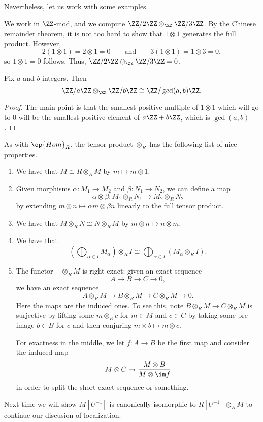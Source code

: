 Nevertheless, let us work with some examples.
\begin{example}
	We work in $\ZZ$-mod, and we compute $\ZZ/2\ZZ\otimes_\ZZ\ZZ/3\ZZ$. By the Chinese remainder theorem, it is not too hard to show that $1\otimes1$ generates the full product. However,
	\[2(1\otimes1)=2\otimes1=0\qquad\text{and}\qquad3(1\otimes1)=1\otimes3=0,\]
	so $1\otimes1=0$ follows. Thus, $\ZZ/2\ZZ\otimes_\ZZ\ZZ/3\ZZ=0$.
\end{example}
\begin{prop}
	Fix $a$ and $b$ integers. Then
	\[\ZZ/a\ZZ\otimes_\ZZ\ZZ/b\ZZ\cong\ZZ/\gcd(a,b)\ZZ.\]
\end{prop}
\begin{proof}
	The main point is that the smallest positive multiple of $1\otimes1$ which will go to $0$ will be the smallest positive element of $a\ZZ+b\ZZ$, which is $\gcd(a,b)$.
\end{proof}
As with $\op{Hom}_R$, the tensor product $\otimes_R$ has the following list of nice properties.
\begin{enumerate}
	\item We have that $M\cong R\otimes_RM$ by $m\mapsto m\otimes1$.
	\item Given morphisms $\alpha:M_1\to M_2$ and $\beta:N_1\to N_2$, we can define a map
	\[\alpha\otimes\beta:M_1\otimes_R N_1\to M_2\otimes_R N_2\]
	by extending $m\otimes n\mapsto\alpha m\otimes\beta n$ linearly to the full tensor product.
	\item We have that $M\otimes_R N\cong N\otimes_R M$ by $m\otimes n\mapsto n\otimes m$.
	\item We have that
	\[\left(\bigoplus_{\alpha\in I}M_\alpha\right)\otimes_RI\cong\bigoplus_{\alpha\in I}(M_\alpha\otimes_R I).\]
	\item The functor $-\otimes_RM$ is right-exact: given an exact sequence
	\[A\to B\to C\to 0,\]
	we have an exact sequence
	\[A\otimes_RM\to B\otimes_RM\to C\otimes_RM\to 0.\]
	Here the maps are the induced ones. To see this, note $B\otimes_RM\to C\otimes_RM$ is surjective by lifting some $m\otimes_Rc$ for $m\in M$ and $c\in C$ by taking some pre-image $b\in B$ for $c$ and then conjuring $m\times b\mapsto m\otimes c$.

	For exactness in the middle, we let $f:A\to B$ be the first map and consider the induced map
	\[M\otimes C\to\frac{M\otimes B}{M\otimes\im f}\]
	in order to split the short exact sequence or something.
\end{enumerate}
Next time we will show $M\left[U^{-1}\right]$ is canonically isomorphic to $R\left[U^{-1}\right]\otimes_RM$ to continue our discusion of localization.